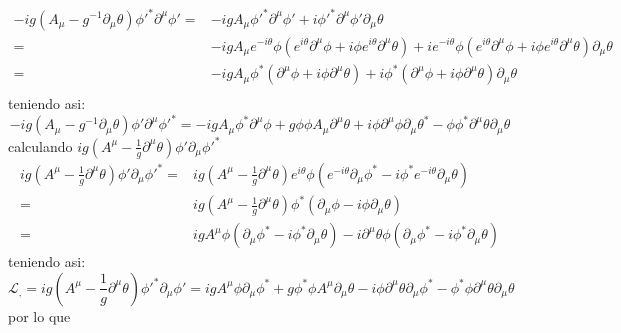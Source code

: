 \begin{itemize}
    \begin{align*}
        -ig \left(A_\mu- g^{-1}\partial_\mu \theta\right) {\phi}'^* \partial^\mu {\phi}' =& -igA_\mu {\phi}'^* \partial^\mu {\phi}'+i {\phi}'^* \partial^\mu {\phi}' \partial_\mu \theta \\
        =& -ig A_\mu e^{-i\theta} \phi \left(e^{i\theta} \partial^\mu \phi +i \phi e^{i\theta} \partial^\mu \theta \right) +ie^{-i\theta}\phi \left(e^{i\theta} \partial^\mu \phi +i \phi e^{i\theta} \partial^\mu \theta \right) \partial_\mu \theta\\
        =& -igA_\mu\phi^* \left(\partial^\mu \phi + i\phi\partial^\mu \theta\right) + i \phi^* \left(\partial^\mu \phi + i\phi\partial^\mu \theta\right) \partial_\mu \theta\\
    \end{align*}
    teniendo asi:
    \begin{equation*}
        -ig \left(A_\mu- g^{-1}\partial_\mu \theta\right) {\phi}' \partial^\mu {\phi}'^*= 
        -igA_\mu \phi^* \partial^\mu \phi
         + g\phi \phi A_\mu \partial^\mu \theta 
         + i \phi \partial^\mu \phi \partial_\mu \theta^*
         - \phi \phi^* \partial^\mu \theta \partial_\mu \theta
    \end{equation*}
    calculando $ig \left(A^\mu- \frac{1}{g}\partial^\mu \theta\right) {\phi}' \partial_\mu {\phi}'^*$
    \begin{align*}
        ig \left(A^\mu- \frac{1}{g}\partial^\mu \theta\right) {\phi}' \partial_\mu {\phi}'^*=&ig \left(A^\mu- \frac{1}{g}\partial^\mu \theta\right) e^{i\theta}{\phi} \left(e^{-i\theta}\partial_\mu \phi^* - i\phi^* e^{-i\theta} \partial_\mu \theta\right)\\
        =& ig \left(A^\mu- \frac{1}{g}\partial^\mu \theta\right) {\phi}^* \left(\partial_\mu \phi - i \phi \partial_\mu \theta \right)\\
        =&ig A^\mu \phi \left(\partial_\mu \phi^* - i \phi^* \partial_\mu \theta \right) - i\partial^\mu \theta \phi \left(\partial_\mu \phi^* - i\phi^* \partial_\mu \theta \right)
    \end{align*}
    teniendo asi:
    \begin{equation*}
        \mathcal{L}_,=ig \left(A^\mu- \frac{1}{g}\partial^\mu \theta\right) {\phi}'^* \partial_\mu {\phi}' = igA^\mu \phi \partial_\mu \phi^* + g\phi^* \phi A^\mu \partial_\mu \theta -i \phi \partial^\mu \theta\partial_\mu \phi^* - \phi^* \phi \partial^\mu \theta\partial_\mu \theta
    \end{equation*}
    por lo que

\end{itemize}
